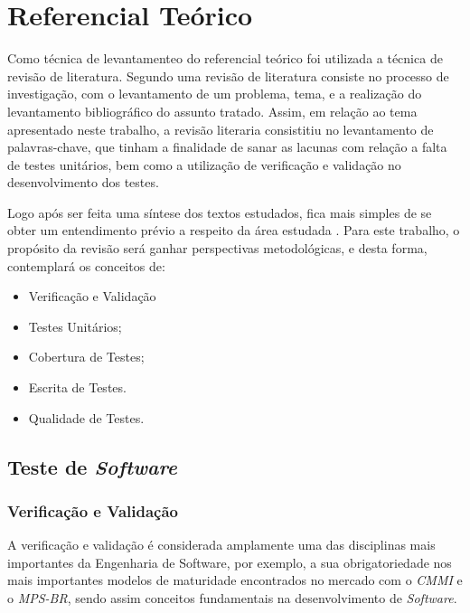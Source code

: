\chapter{Referencial Teórico}

	Como técnica de levantamenteo do referencial teórico foi utilizada a técnica de revisão de literatura. Segundo  uma revisão de literatura consiste no processo de investigação, com o levantamento de um problema, tema, e a realização do levantamento bibliográfico do assunto tratado. Assim, em relação ao tema apresentado neste trabalho, a revisão literaria consistitiu no levantamento de palavras-chave, que tinham a finalidade de sanar as lacunas com relação a falta de testes unitários, bem como a utilização de verificação e validação no desenvolvimento dos testes.

    Logo após ser feita uma síntese dos textos estudados, fica mais simples de se obter um entendimento prévio a respeito da área estudada  .
    Para este trabalho, o propósito da revisão será ganhar perspectivas metodológicas, e desta forma, contemplará os conceitos de:

    \begin{itemize}

        \item Verificação e Validação
        \item Testes Unitários;
        \item Cobertura de Testes;
        \item Escrita de Testes.
        \item Qualidade de Testes.
    \end{itemize}

\vfill
\pagebreak

\section{Teste de \textit{Software}}

\subsection{Verificação e Validação}

A verificação e validação é considerada amplamente uma das disciplinas mais importantes da Engenharia de Software, por exemplo, a sua obrigatoriedade nos mais importantes modelos de maturidade encontrados no mercado com o \textit{CMMI} e o \textit{MPS-BR}, sendo assim conceitos fundamentais na desenvolvimento de \textit{Software}.

